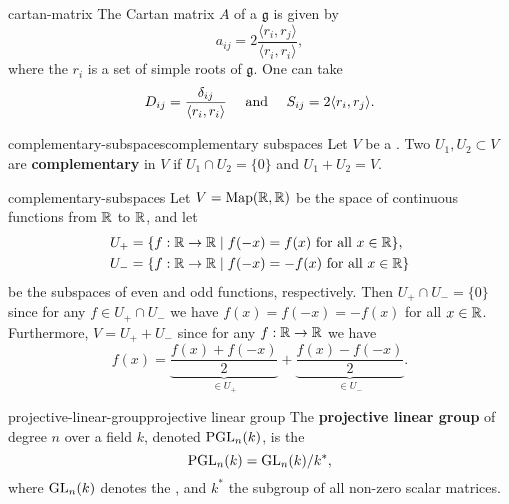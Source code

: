 \begin{example}{cartan-matrix}
    The Cartan matrix $A$ of a  $\mathfrak{g}$ is given by
    \[ a_{ij} = 2 \frac{\langle r_i, r_j \rangle}{\langle r_i, r_i \rangle} , \]
    where the $r_i$ is a set of simple roots of $\mathfrak{g}$. One can take
    \[ D_{ij} = \frac{\delta_{ij}}{\langle r_i, r_i \rangle} \quad \textup{ and } \quad S_{ij} = 2 \langle r_i, r_j \rangle . \]
\end{example}

\begin{topic}{complementary-subspaces}{complementary subspaces}
    Let $V$ be a . Two  $U_1, U_2 \subset V$ are \textbf{complementary} in $V$ if $U_1 \cap U_2 = \{ 0 \}$ and $U_1 + U_2 = V$.
\end{topic}

\begin{example}{complementary-subspaces}
    Let $V = \textup{Map}(\mathbb{R}, \mathbb{R})$ be the space of continuous functions from $\mathbb{R}$ to $\mathbb{R}$, and let
    \[ \begin{aligned}
        U_+ &= \{ f : \mathbb{R} \to \mathbb{R} \;|\; f(-x) = f(x) \textup{ for all } x \in \mathbb{R} \}, \\
        U_- &= \{ f : \mathbb{R} \to \mathbb{R} \;|\; f(-x) = -f(x) \textup{ for all } x \in \mathbb{R} \}
    \end{aligned} \]
    be the subspaces of even and odd functions, respectively. Then $U_+ \cap U_- = \{ 0 \}$ since for any $f \in U_+ \cap U_-$ we have $f(x) = f(-x) = -f(x)$ for all $x \in \mathbb{R}$. Furthermore, $V = U_+ + U_-$ since for any $f : \mathbb{R} \to \mathbb{R}$ we have
    \[ f(x) = \underbrace{\frac{f(x) + f(-x)}{2}}_{\in U_+} + \underbrace{\frac{f(x) - f(-x)}{2}}_{\in U_-} . \]
\end{example}

\begin{topic}{projective-linear-group}{projective linear group}
    The \textbf{projective linear group} of degree $n$ over a field $k$, denoted $\textup{PGL}_n(k)$, is the 
    \[ \textup{PGL}_n(k) = \textup{GL}_n(k) / k^* , \]
    where $\textup{GL}_n(k)$ denotes the , and $k^*$ the subgroup of all non-zero scalar matrices.
\end{topic}
